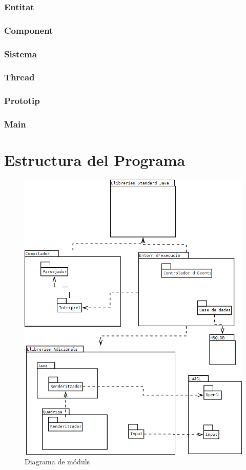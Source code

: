 \subsubsection{Entitat}

\subsubsection{Component}

\subsubsection{Sistema}

\subsubsection{Thread}

\subsubsection{Prototip}

\subsubsection{Main}

\section{Estructura del Programa}

\begin{figure}
  \includegraphics[width=1\linewidth]{./img/Moduls.png}
  \caption{Diagrama de móduls \label{fig:DiagramaDeModuls}}
\end{figure}

